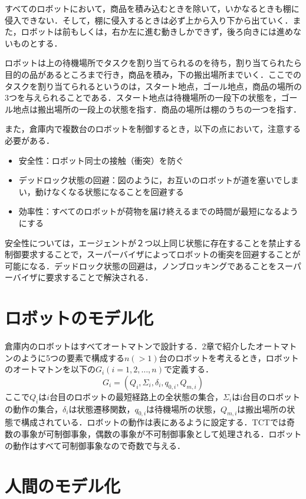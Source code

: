 \documentclass[dvipdfmx]{newthesis}
\begin{document}
すべてのロボットにおいて，商品を積み込むときを除いて，いかなるときも棚に侵入できない．そして，棚に侵入するときは必ず上から入り下から出ていく．また，ロボットは前もしくは，右か左に進む動きしかできず，後ろ向きには進めないものとする．

ロボットは上の待機場所でタスクを割り当てられるのを待ち，割り当てられたら目的の品があるところまで行き，商品を積み，下の搬出場所までいく．ここでのタスクを割り当てられるというのは，スタート地点，ゴール地点，商品の場所の3つを与えられることである．スタート地点は待機場所の一段下の状態を，ゴール地点は搬出場所の一段上の状態を指す．商品の場所は棚のうちの一つを指す．

また，倉庫内で複数台のロボットを制御するとき，以下の点において，注意する必要がある．
\begin{itemize}
    \item 安全性：ロボット同士の接触（衝突）を防ぐ
    \item デッドロック状態の回避：図のように，お互いのロボットが道を塞いでしまい，動けなくなる状態になることを回避する
    \item 効率性：すべてのロボットが荷物を届け終えるまでの時間が最短になるようにする
\end{itemize}
安全性については，エージェントが２つ以上同じ状態に存在することを禁止する制御要求することで，スーパーバイザによってロボットの衝突を回避することが可能になる．デッドロック状態の回避は，ノンブロッキングであることをスーパーバイザに要求することで解決される．

\section{ロボットのモデル化}

倉庫内のロボットはすべてオートマトンで設計する．2章で紹介したオートマトンのように5つの要素で構成する$n(>1)$台のロボットを考えるとき，ロボットのオートマトンを以下の$G_i(i=1,2,\ldots,n)$で定義する．
\begin{equation}
    G_i=(Q_i,\Sigma_i,\delta_i,q_{0,i},Q_{m,i})
\end{equation}
ここで$Q_i$は$i$台目のロボットの最短経路上の全状態の集合，$\Sigma_i$はi台目のロボットの動作の集合，$\delta_i$は状態遷移関数，$q_{0,i}$は待機場所の状態，$Q_{m,i}$は搬出場所の状態で構成されている．ロボットの動作は表にあるように設定する．TCTでは奇数の事象が可制御事象，偶数の事象が不可制御事象として処理される．ロボットの動作はすべて可制御事象なので奇数で与える．

\section{人間のモデル化}
\end{document}

